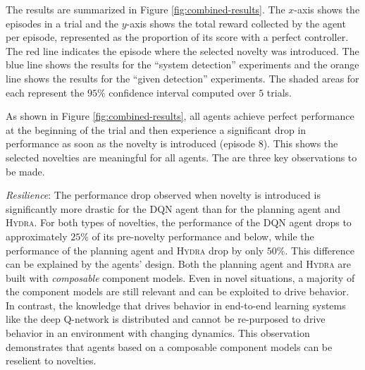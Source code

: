 \documentclass[letterpaper]{article} %
\newcommand{\hydra}{\textsc{Hydra}\xspace} %
\begin{document}
The results are summarized in Figure \ref{fig:combined-results}. The $x$-axis shows the episodes in a trial and the $y$-axis shows the total reward collected by the agent per episode, represented as the proportion of its score with a perfect controller. 
The red line indicates the episode where the selected novelty was introduced. 
The blue line shows the results for the ``system detection'' experiments and the orange line shows the results for the ``given detection'' experiments. The shaded areas for each represent the $95\%$ confidence interval computed over $5$ trials.


As shown in Figure \ref{fig:combined-results}, all agents achieve perfect performance at the beginning of the trial and then experience a significant drop in performance as soon as the novelty is introduced (episode $8$). This shows the selected novelties are meaningful for all agents. The are three key observations to be made.

\emph{Resilience}: The performance drop observed when novelty is introduced is significantly more drastic for the DQN agent than for the planning agent and \hydra. For both types of novelties, the performance of the DQN agent drops to approximately $25\%$ of its pre-novelty performance and below, while the performance of the planning agent and \hydra drop by only $50\%$. 
This difference can be explained by the agents' design. 
Both the planning agent and \hydra are built with \emph{composable} component models. 
Even in novel situations, a majority of the component models are still relevant and can be exploited to drive behavior. 
In contrast, the knowledge that drives behavior in end-to-end learning systems like the deep Q-network is distributed and cannot be re-purposed to drive behavior in an environment with changing dynamics. 
This observation demonstrates that agents based on a composable component models can be reselient to novelties.
\end{document}
